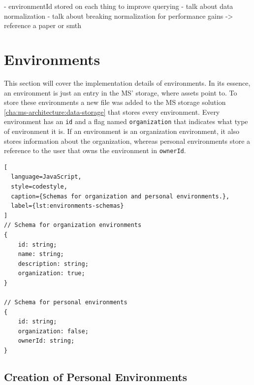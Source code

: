 - environmentId stored on each thing to improve querying
- talk about data normalization
- talk about breaking normalization for performance gains -> reference a paper or smth

\section{Environments}


This section will cover the implementation details of environments.
In its essence, an environment is just an entry in the MS' storage, where assets point to.
To store these environments a new file was added to the MS storage solution
\ref{cha:ms-architecture:data-storage} that stores every environment.
Every environment has an \lstinline{id} and a flag named \lstinline{organization} that
indicates what type of environment it is.
If an environment is an organization environment, it also stores information about the
organization,
whereas personal environments store a reference to the user that owns the environment in
\lstinline{ownerId}.

\begin{lstlisting}[
  language=JavaScript,
  style=codestyle,
  caption={Schemas for organization and personal environments.},
  label={lst:environments-schemas}
]
// Schema for organization environments
{
    id: string;
    name: string;
    description: string;
    organization: true;
}

// Schema for personal environments
{
    id: string;
    organization: false;
    ownerId: string;
}
\end{lstlisting}

\subsection{Creation of Personal Environments}

%
%

